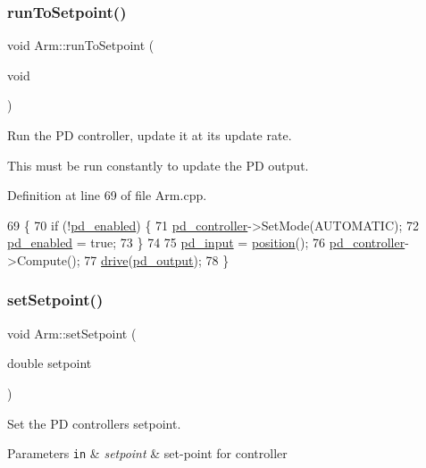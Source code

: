 \subsubsection{\texorpdfstring{run\+To\+Setpoint()}{runToSetpoint()}}
{\footnotesize\ttfamily void Arm\+::run\+To\+Setpoint (\begin{DoxyParamCaption}\item[{void}]{ }\end{DoxyParamCaption})}



Run the PD controller, update it at its update rate. 

This must be run constantly to update the PD output. 

Definition at line 69 of file Arm.\+cpp.


\begin{DoxyCode}
69                             \{
70     \textcolor{keywordflow}{if} (!\hyperlink{class_arm_a44b074fd8db815261bc634f914c1e0f8}{pd\_enabled}) \{
71         \hyperlink{class_arm_a6a6a8ec7d6f383efd1672c1760a32887}{pd\_controller}->SetMode(AUTOMATIC);
72         \hyperlink{class_arm_a44b074fd8db815261bc634f914c1e0f8}{pd\_enabled} = \textcolor{keyword}{true};
73     \}
74 
75     \hyperlink{class_arm_aa8cb716ce90ab9d02f8e4ab3735904cb}{pd\_input} = \hyperlink{class_arm_a2688295ef2029461e65723d1563f7a28}{position}();
76     \hyperlink{class_arm_a6a6a8ec7d6f383efd1672c1760a32887}{pd\_controller}->Compute();
77     \hyperlink{class_arm_a50abf82c871d15bbbfd669b4f33a0d60}{drive}(\hyperlink{class_arm_a75af15c369c67a1563f198e029bae1e4}{pd\_output});
78 \}
\end{DoxyCode}
\mbox{\label{class_arm_a331502c3508a7d8137d9405f050ecbbf}} 
\subsubsection{\texorpdfstring{set\+Setpoint()}{setSetpoint()}}
{\footnotesize\ttfamily void Arm\+::set\+Setpoint (\begin{DoxyParamCaption}\item[{double}]{setpoint }\end{DoxyParamCaption})}



Set the PD controller\textquotesingle{}s setpoint. 


\begin{DoxyParams}[1]{Parameters}
\mbox{\tt in}  & {\em setpoint} & set-\/point for controller \\
\hline
\end{DoxyParams}


